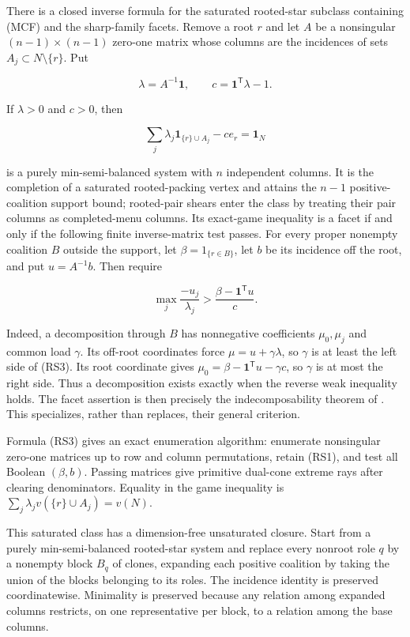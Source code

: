 \documentclass[11pt]{article}
\newcommand{\one}{\mathbf 1}
\begin{document}
There is a closed inverse formula for the saturated rooted-star subclass
containing (MCF) and the sharp-family facets.  Remove a root $r$ and
let $A$ be a nonsingular $(n-1)\times(n-1)$ zero-one matrix whose columns are
the incidences of sets $A_j\subset N\setminus\{r\}$.  Put

\[
 \lambda=A^{-1}\one,
 \qquad c=\one^\mathsf T\lambda-1.                   \tag{RS1}
\]

If $\lambda>0$ and $c>0$, then

\[
 \sum_j\lambda_j\one_{\{r\}\cup A_j}-c e_r=\one_N \tag{RS2}
\]

is a purely min-semi-balanced system with $n$ independent columns.  It is the
completion of a saturated rooted-packing vertex and attains the $n-1$
positive-coalition support bound; rooted-pair shears enter the class by
treating their pair columns as completed-menu columns.  Its exact-game
inequality is a facet if
and only if the following finite inverse-matrix test passes.  For every
proper nonempty coalition $B$ outside the support, let $\beta=1_{\{r\in B\}}$,
let $b$ be its incidence off the root, and put $u=A^{-1}b$.  Then require

\[
 \max_j\frac{-u_j}{\lambda_j}
  >\frac{\beta-\one^\mathsf T u}{c}.                 \tag{RS3}
\]

Indeed, a decomposition through $B$ has nonnegative coefficients
$\mu_0,\mu_j$ and common load $\gamma$.  Its off-root coordinates force
$\mu=u+\gamma\lambda$, so $\gamma$ is at least the left side of (RS3).  Its
root coordinate gives
$\mu_0=\beta-\one^\mathsf T u-\gamma c$, so $\gamma$ is at most the right
side.  Thus a decomposition exists exactly when the reverse weak inequality
holds.  The facet assertion is then precisely the indecomposability theorem
of \citet{StudenyKratochvil2022}.  This specializes, rather than replaces,
their general criterion.

Formula (RS3) gives an exact enumeration algorithm: enumerate nonsingular
zero-one matrices up to row and column permutations, retain (RS1), and test
all Boolean $(\beta,b)$.  Passing matrices give primitive dual-cone extreme
rays after clearing denominators.  Equality in the game inequality is
$\sum_j\lambda_jv(\{r\}\cup A_j)=v(N)$.

This saturated class has a dimension-free unsaturated closure.  Start from
a purely min-semi-balanced rooted-star system and replace every nonroot role
$q$ by a
nonempty block $B_q$ of clones, expanding each positive coalition by taking
the union of the blocks belonging to its roles.  The incidence identity is
preserved coordinatewise.  Minimality is preserved because any relation
among expanded columns restricts, on one representative per block, to a
relation among the base columns.
\end{document}
